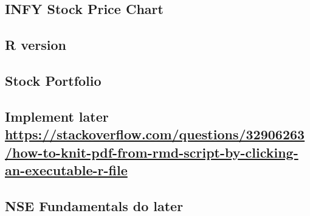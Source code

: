\documentclass[
]{article}
\begin{document}
\hypertarget{infy-stock-price-chart}{%
\subsection{\texorpdfstring{ INFY Stock Price
Chart}{ INFY Stock Price Chart}}\label{infy-stock-price-chart}}

\hypertarget{r-version}{%
\subsection{R version}\label{r-version}}

\hypertarget{stock-portfolio}{%
\subsection{Stock Portfolio}\label{stock-portfolio}}

\hypertarget{implement-later-httpsstackoverflow.comquestions32906263how-to-knit-pdf-from-rmd-script-by-clicking-an-executable-r-file}{%
\subsection{\texorpdfstring{Implement later
\url{https://stackoverflow.com/questions/32906263/how-to-knit-pdf-from-rmd-script-by-clicking-an-executable-r-file}}{Implement later https://stackoverflow.com/questions/32906263/how-to-knit-pdf-from-rmd-script-by-clicking-an-executable-r-file}}\label{implement-later-httpsstackoverflow.comquestions32906263how-to-knit-pdf-from-rmd-script-by-clicking-an-executable-r-file}}

\hypertarget{nse-fundamentals-do-later}{%
\subsection{NSE Fundamentals do later}\label{nse-fundamentals-do-later}}
\end{document}

